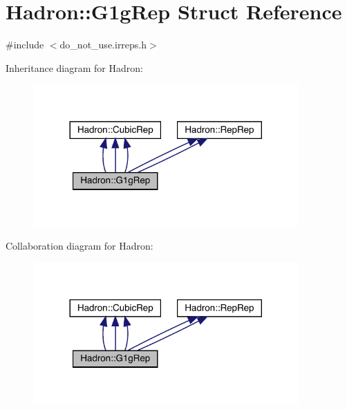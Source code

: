 \hypertarget{structHadron_1_1G1gRep}{}\section{Hadron\+:\+:G1g\+Rep Struct Reference}
\label{structHadron_1_1G1gRep}


{\ttfamily \#include $<$do\+\_\+not\+\_\+use.\+irreps.\+h$>$}



Inheritance diagram for Hadron\+:
\nopagebreak
\begin{figure}[H]
\begin{center}
\leavevmode
\includegraphics[width=288pt]{df/d36/structHadron_1_1G1gRep__inherit__graph}
\end{center}
\end{figure}


Collaboration diagram for Hadron\+:
\nopagebreak
\begin{figure}[H]
\begin{center}
\leavevmode
\includegraphics[width=288pt]{d9/d78/structHadron_1_1G1gRep__coll__graph}
\end{center}
\end{figure}
